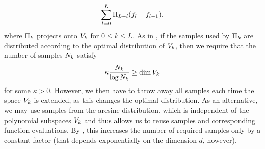   \begin{equation}
  \label{eq:adaptive}
  \sum_{l=0}^{L}\P_{{L-l}}(\rs_l-\rs_{l-1}).
  \end{equation}
  where $\P_{k}$ projects onto $\vsp_{k}$ for $0\leq k\leq L$.
As in , if the samples used by $\P_{{k}}$ are distributed according to the optimal distribution of $\vsp_{k}$, then we require that the number of samples $\NS_{k}$ satisfy
 \begin{equation}
 \label{eq:adaptivestability}
 \kappa \frac{\NS_k}{\log \NS_k}\geq \dim \vsp_{k}
 \end{equation}
 for some $\kappa>0$. However, we then have to throw away all samples each time the space $\vsp_{k}$ is extended, as this changes the optimal distribution. As an alternative, we may use samples from the arcsine distribution, which is independent of the polynomial subspaces $\vsp_{k}$ and thus allows us to reuse samples and corresponding function evaluations. By , this increases the number of required samples only by a constant factor (that depends exponentially on the dimension $d$, however).\\

